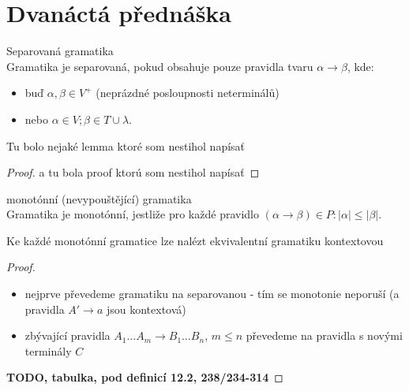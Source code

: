 \documentclass[../main.tex]{subfiles}
\begin{document}
\section{Dvanáctá přednáška}
\begin{definition}
    Separovaná gramatika\\
    Gramatika je separovaná, pokud obsahuje pouze pravidla tvaru $\alpha \rightarrow \beta$, kde:
    \begin{itemize}
        \item buď $\alpha,\beta \in V^+$ (neprázdné posloupnosti neterminálů)
        \item nebo $\alpha \in V; \beta \in T \cup {\lambda}$.
    \end{itemize}
\end{definition}
\begin{theorem}
    Tu bolo nejaké lemma ktoré som nestihol napísať
    \begin{proof}
        a tu bola proof ktorú som nestihol napísať
    \end{proof}
\end{theorem}
\begin{definition}
    monotónní (nevypouštějící) gramatika\\
    Gramatika je monotónní, jestliže pro každé pravidlo $(\alpha \rightarrow \beta)\in P : |\alpha| \leq |\beta|$.  
\end{definition}
\begin{theorem}
    Ke každé monotónní gramatice lze nalézt ekvivalentní gramatiku kontextovou
    \begin{proof}
        \begin{itemize}
            \item nejprve převedeme gramatiku na separovanou - tím se monotonie neporuší (a pravidla $A'\rightarrow a$ jsou kontextová)
            \item zbývající pravidla $A_1\dots A_m \rightarrow B_1 \dots B_n$, $m \leq n$ převedeme na pravidla s novými terminály $C$
        \end{itemize}
        \textbf{TODO, tabulka, pod definicí 12.2, 238/234-314}
    \end{proof}
\end{theorem}
\end{document}
